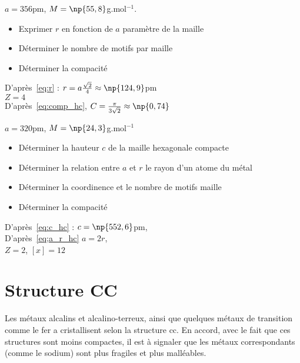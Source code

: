 \begin{ex}
    $a = 356$pm,
    $M = \np{55,8}$g.mol$^{-1}$.\\
    \begin{itemize}
        \item Exprimer $r$ en fonction de $a$ paramètre
            de la maille
        \item Déterminer le nombre de motifs par maille
        \item Déterminer la compacité
    \end{itemize}
    D'après~\ref{eq:r} : $r = a\frac{\sqrt{2}}{4} \approx \np{124,9}$pm\\
    $Z = 4$\\
    D'après~\ref{eq:comp_hc}, $C = \frac{\pi}{3\sqrt{2}} \approx \np{0,74}$
\end{ex}
\begin{ex}
    $a = 320$pm,
    $M = \np{24,3}$g.mol$^{-1}$
    \begin{itemize}
        \item Déterminer la hauteur $c$ de la maille hexagonale
            compacte
        \item Déterminer la relation entre $a$ et $r$ le rayon
            d'un atome du métal
        \item Déterminer la coordinence et le nombre de motifs
            maille
        \item Déterminer la compacité
    \end{itemize}
    D'après~\ref{eq:c_hc} : $c = \np{552,6}$pm,\\
    D'après~\ref{eq;a_r_hc} $a = 2r$,\\
    $Z = 2$, $[x] = 12$
\end{ex}


\section{Structure CC}
Les métaux alcalins et alcalino-terreux, ainsi que quelques 
métaux de transition comme le fer a cristallisent selon la structure cc.
En accord, avec le fait que ces structures sont moins compactes,
il est à signaler que les métaux correspondants (comme le sodium) sont
plus fragiles et plus malléables.

